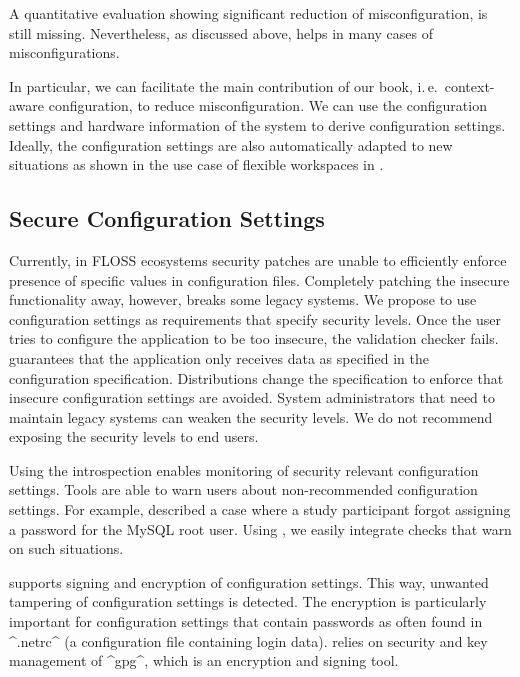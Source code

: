 \begin{code}[language=Cpp,firstnumber=19]
A quantitative evaluation showing significant reduction of misconfiguration, is still missing.
Nevertheless, as discussed above, \elektra{} helps in many cases of misconfigurations.

In particular, we can facilitate the main contribution of our book, i.\,e.\ context-aware configuration, to reduce misconfiguration.
We can use the configuration settings and hardware information of the system to derive configuration settings.
Ideally, the configuration settings are also automatically adapted to new situations as shown in the use case of flexible workspaces in .




\subsection{Secure Configuration Settings}
\label{sec:secure-configuration}

Currently, in FLOSS ecosystems security patches are unable to efficiently enforce presence of specific values in configuration files.
Completely patching the insecure functionality away, however, breaks some legacy systems.
We propose to use configuration settings as requirements that specify security levels.
Once the user tries to configure the application to be too insecure, the validation checker fails.
\elektra{} guarantees that the application only receives data as specified in the configuration specification.
Distributions change the specification to enforce that insecure configuration settings are avoided.
System administrators that need to maintain legacy systems can weaken the security levels.
We do not recommend exposing the security levels to end users.

Using the introspection \elektra{} enables monitoring of security relevant configuration settings.
Tools are able to warn users about non-recommended configuration settings.
For example, \citet{nagaraja2004understanding} described a case where a study participant forgot assigning a password for the MySQL root user.
Using \elektra{}, we easily integrate checks that warn on such situations.

\elektra{} supports signing and encryption of configuration settings.
This way, unwanted tampering of configuration settings is detected.
The encryption is particularly important for configuration settings that contain passwords as often found in ^.netrc^ (a configuration file containing login data).
\elektra{} relies on security and key management of ^gpg^, which is an encryption and signing tool.


\end{code}
